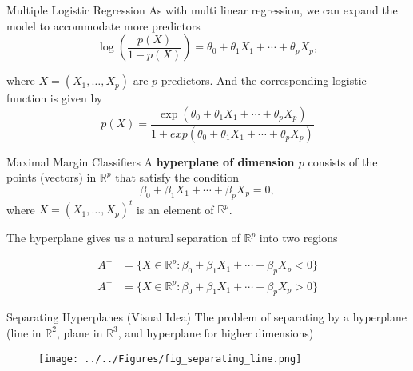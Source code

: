 \documentclass{beamer}
\begin{document}
\begin{frame}{Multiple Logistic Regression}
	As with multi linear regression, we can expand the model to accommodate more predictors
	\begin{equation*}
		\log \left( \frac{p(X)}{1-p(X)} \right) = \theta_0 + \theta_1 X_1 + \cdots+ \theta_p X_p,
	\end{equation*} 
	
	where $X=(X_1,\ldots,X_p)$ are $p$ predictors. And the corresponding logistic function is given by
	\begin{equation*}
		p(X)= \frac{\exp(\theta_0 + \theta_1 X_1 + \cdots+ \theta_p X_p)}{1 +exp(\theta_0 + \theta_1 X_1 + \cdots+ \theta_p X_p) }
	\end{equation*}
\end{frame}

\begin{frame}{Maximal Margin Classifiers}
	A {\bf hyperplane of dimension $p$} consists of the points (vectors) in $
\mathbb{R}^p$ that satisfy the condition
\begin{equation}
	\beta_0 + \beta_1 X_1 + \cdots + \beta_p X_p=0,
	\label{eq:hyper}
\end{equation}
where $X= (X_1,\ldots, X_p)^t $ is an element of $\mathbb{R}^p$. 

The hyperplane gives us a natural separation of $\mathbb{R}^p$ into two regions

\begin{equation*}
	\begin{split}
		A^-&= \{X \in \mathbb{R}^p : \beta_0 + \beta_1 X_1 + \cdots + \beta_p X_p<0 \} \\
		A^+&= \{X \in \mathbb{R}^p : \beta_0 + \beta_1 X_1 + \cdots + \beta_p X_p >0 \}
	\end{split}		
\end{equation*}

\end{frame}

\begin{frame}{Separating Hyperplanes (Visual Idea)}
	The problem of separating by a hyperplane (line in $\mathbb{R}^2$, plane in $\mathbb{R}^3$, and hyperplane for higher dimensions)
	
		\begin{figure}[h]
		\centering
		\texttt{[image: ../../Figures/fig\_separating\_line.png]}
	\end{figure}
	
\end{frame}
\end{document}
